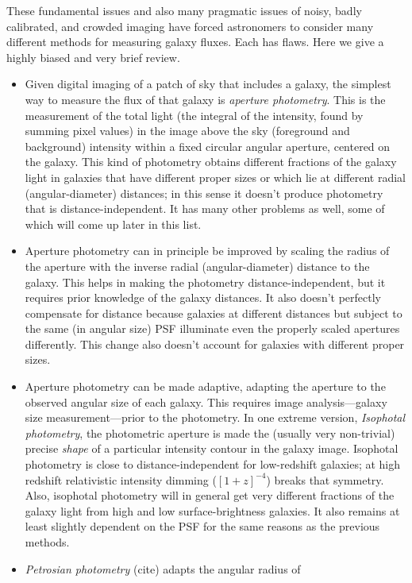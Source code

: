 \documentclass[12pt,preprint,pdftex]{aastex}
\begin{document}
These fundamental issues and also many pragmatic issues of noisy,
badly calibrated, and crowded imaging have forced astronomers to
consider many different methods for measuring galaxy fluxes.  Each has
flaws.  Here we give a highly biased and very brief review.
\begin{itemize}
\item Given digital imaging of a patch of sky that includes a galaxy,
  the simplest way to measure the flux of that galaxy is
  \emph{aperture photometry}.  This is the measurement of the total
  light (the integral of the intensity, found by summing pixel values)
  in the image above the sky (foreground and background) intensity
  within a fixed circular angular aperture, centered on the galaxy.
  This kind of photometry obtains different fractions of the galaxy
  light in galaxies that have different proper sizes or which lie at
  different radial (angular-diameter) distances; in this sense it
  doesn't produce photometry that is distance-independent.  It has
  many other problems as well, some of which will come up later in
  this list.
\item Aperture photometry can in principle be improved by scaling the
  radius of the aperture with the inverse radial (angular-diameter)
  distance to the galaxy.  This helps in making the photometry
  distance-independent, but it requires prior knowledge of the galaxy
  distances.  It also doesn't perfectly compensate for distance
  because galaxies at different distances but subject to the same (in
  angular size) PSF illuminate even the properly scaled apertures
  differently.  This change also doesn't account for galaxies with
  different proper sizes.
\item Aperture photometry can be made adaptive, adapting the aperture
  to the observed angular size of each galaxy.  This requires image
  analysis---galaxy size measurement---prior to the photometry.  In
  one extreme version, \emph{Isophotal photometry}, the photometric
  aperture is made the (usually very non-trivial) precise \emph{shape}
  of a particular intensity contour in the galaxy image.  Isophotal
  photometry is close to distance-independent for low-redshift
  galaxies; at high redshift relativistic intensity dimming
  ($[1+z]^{-4}$) breaks that symmetry.  Also, isophotal photometry
  will in general get very different fractions of the galaxy light
  from high and low surface-brightness galaxies.  It also remains at
  least slightly dependent on the PSF for the same reasons as the
  previous methods.
\item \emph{Petrosian photometry} (cite) adapts the angular radius of

\end{itemize}
\end{document}
